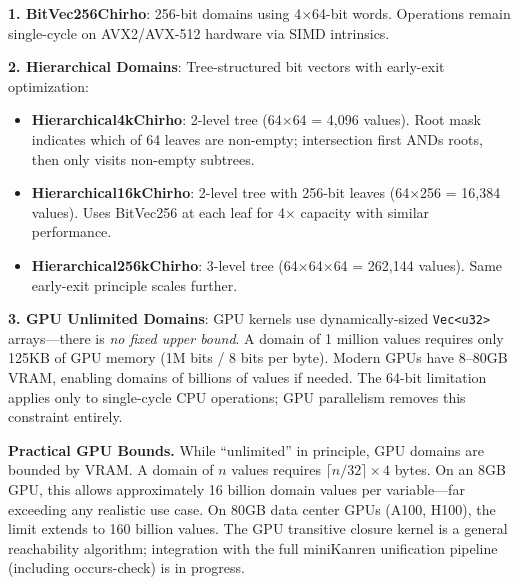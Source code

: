 \documentclass[11pt,a4paper]{article}
\begin{document}
\textbf{1. BitVec256Chirho}: 256-bit domains using 4$\times$64-bit words. Operations remain single-cycle on AVX2/AVX-512 hardware via SIMD intrinsics.

\textbf{2. Hierarchical Domains}: Tree-structured bit vectors with early-exit optimization:
\begin{itemize}
  \item \textbf{Hierarchical4kChirho}: 2-level tree (64$\times$64 = 4,096 values). Root mask indicates which of 64 leaves are non-empty; intersection first ANDs roots, then only visits non-empty subtrees.
  \item \textbf{Hierarchical16kChirho}: 2-level tree with 256-bit leaves (64$\times$256 = 16,384 values). Uses BitVec256 at each leaf for 4$\times$ capacity with similar performance.
  \item \textbf{Hierarchical256kChirho}: 3-level tree (64$\times$64$\times$64 = 262,144 values). Same early-exit principle scales further.
\end{itemize}

\textbf{3. GPU Unlimited Domains}: GPU kernels use dynamically-sized \texttt{Vec<u32>} arrays---there is \emph{no fixed upper bound}.
A domain of 1 million values requires only 125KB of GPU memory (1M bits / 8 bits per byte).
Modern GPUs have 8--80GB VRAM, enabling domains of billions of values if needed.
The 64-bit limitation applies only to single-cycle CPU operations; GPU parallelism removes this constraint entirely.

\textbf{Practical GPU Bounds.}
While ``unlimited'' in principle, GPU domains are bounded by VRAM.
A domain of $n$ values requires $\lceil n/32 \rceil \times 4$ bytes.
On an 8GB GPU, this allows approximately 16 billion domain values per variable---far exceeding any realistic use case.
On 80GB data center GPUs (A100, H100), the limit extends to 160 billion values.
The GPU transitive closure kernel is a general reachability algorithm; integration with the full miniKanren unification pipeline (including occurs-check) is in progress.
\end{document}
